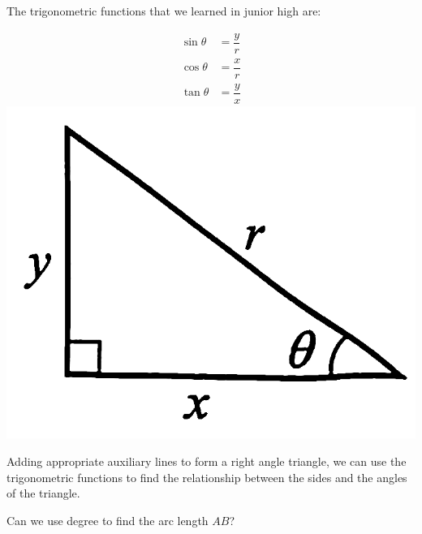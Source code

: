 \documentclass{report}
\begin{document}
\begin{info}
	        
	\noindent The trigonometric functions that we learned in junior high are:
	\begin{multicols}{2}
		\vspace*{-3em}
		\begin{align*}
			\sin \theta & = \dfrac{y}{r} \\
			\cos \theta & = \dfrac{x}{r} \\
			\tan \theta & = \dfrac{y}{x} 
		\end{align*}
		\columnbreak
		\includegraphics[scale=0.12]{assets/8-8.png}
	\end{multicols}
	\vspace{-2em}
	Adding appropriate auxiliary lines to form a right angle triangle, we can use the trigonometric functions to find the relationship between the sides and the angles of the triangle.
\end{info}
\vspace{1em}
\begin{think}
	   
	\noindent Can we use degree to find the arc length $AB$?
\end{think}

\end{document}
